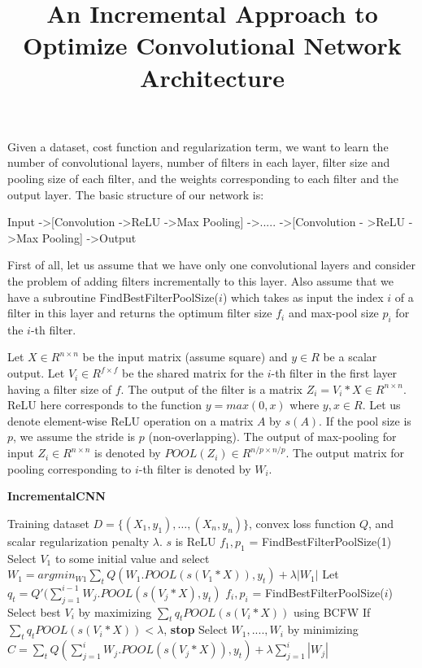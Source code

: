\documentclass{article}
\title{An Incremental Approach to Optimize Convolutional Network Architecture}
\begin{document}
\maketitle

Given a dataset, cost function and regularization term, we want to learn the number of convolutional layers, number of filters in each layer, filter size and pooling size of each filter, and the weights corresponding to each filter and the output layer. The basic structure of our network is:

Input -\textgreater [Convolution -\textgreater ReLU -\textgreater Max Pooling] -\textgreater ..... -\textgreater [Convolution - \textgreater ReLU -\textgreater Max Pooling] -\textgreater Output

First of all, let us assume that we have only one convolutional layers and consider the problem of adding filters incrementally to this layer. Also assume that we have a subroutine FindBestFilterPoolSize($i$) which takes as input the index $i$ of a filter in this layer and returns the optimum filter size $f_i$ and max-pool size $p_i$ for the $i$-th filter.

Let $X \in R^{n \times n}$ be the input matrix (assume square) and $y \in R$ be a scalar output. Let $V_i \in R^{f \times f}$ be the shared matrix for the $i$-th filter in the first layer having a filter size of $f$. The output of the filter is a matrix $Z_i = V_i * X \in R^{n \times n}$. ReLU here corresponds to the function $y = max(0, x)$ where $y, x \in R$. Let us denote element-wise ReLU operation on a matrix $A$ by $s(A)$. If the pool size is $p$, we assume the stride is $p$ (non-overlapping). The output of max-pooling for input $Z_i \in R^{n \times n}$ is denoted by $POOL(Z_i) \in R^{n/p \times n/p}$. The output matrix for pooling corresponding to $i$-th filter is denoted by $W_i$.

\begin{algorithm}
\caption{{\bf IncrementalCNN}}\label{incremental_algo}
\begin{algorithmic}
 Training dataset $D = \{(X_1, y_1), \dots, (X_n, y_n)\}$, convex loss function $Q$, and scalar regularization penalty $\lambda$. $s$ is ReLU
\STATE $f_1, p_1$ = FindBestFilterPoolSize(1)
\STATE Select $V_1$ to some initial value and select $W_1 = argmin_{W1} \sum_t Q(W_1.POOL(s(V_1 * X)), y_t) + \lambda |W_1|$
\STATE Let $q_t = Q'(\sum_{j = 1}^{i - 1} W_j . POOL(s(V_j * X), y_t)$ 
\STATE $f_i, p_i$ = FindBestFilterPoolSize($i$)
\STATE Select best $V_i$ by maximizing $\sum_{t} q_t POOL(s(V_i * X))$ using BCFW
\STATE If $\sum_{t} q_t POOL(s(V_i * X)) < \lambda$, {\bf stop}
\STATE Select $W_1, ...., W_i$ by minimizing $C =  \sum_t Q(\sum_{j = 1}^{i} W_j . POOL(s(V_j * X)), y_t) + \lambda \sum_{j = 1}^{i}|W_j|$
\ENDFOR
\end{algorithmic}
\end{algorithm}



\newpage


\end{document}
